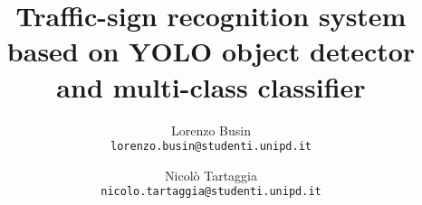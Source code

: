 \documentclass[10pt,twocolumn,letterpaper]{article}
\begin{document}
\title{Traffic-sign recognition system based on YOLO object detector and multi-class classifier}

\author{Lorenzo Busin\\
{\tt\small lorenzo.busin@studenti.unipd.it}
\and
Nicolò Tartaggia\\
{\tt\small nicolo.tartaggia@studenti.unipd.it}
}

\maketitle

\let\clearpage\relax


\end{document}
